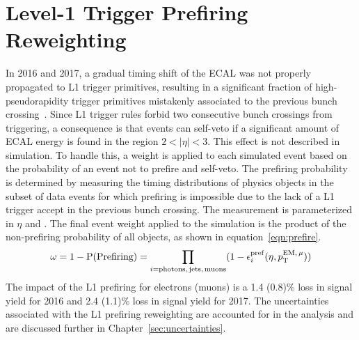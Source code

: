 \section{Level-1 Trigger Prefiring Reweighting}\label{sec:L1}
In 2016 and 2017, a gradual timing shift of the ECAL was not properly propagated to 
L1 trigger primitives, resulting in a significant fraction of high-pseudorapidity trigger primitives
mistakenly associated to the previous bunch crossing~\cite{L1_prefire}. 
Since L1 trigger rules forbid two consecutive bunch crossings from triggering, 
a consequence is that events can self-veto if a significant amount of ECAL energy is found in the region 
$2<|\eta|<3$. This effect is not described in simulation.
To handle this, a weight is applied to each simulated event based on the probability of an event not to prefire and self-veto. 
The prefiring probability is determined by measuring the timing distributions of physics objects in the subset of data events for which prefiring 
is impossible due to the lack of a L1 trigger accept in the previous bunch crossing. The measurement is parameterized in 
$\eta$ and \pt. The final event weight applied to the simulation is the product of the non-prefiring probability of all objects, as shown in equation~\ref{eqn:prefire}.
\begin{equation}
	\omega = 1 - \mathrm{P(Prefiring)} = \prod_{i=\mathrm{photons,\,jets,\,muons}}(1-\epsilon_i^{\mathrm{pref}}(\eta,p_{\mathrm{T}}^{\mathrm{EM,\,\mu}}))
	\label{eqn:prefire}
\end{equation}
The impact of the L1 prefiring for electrons (muons) is a 1.4 (0.8)\% loss in signal yield for 2016 and 2.4 (1.1)\% loss in signal yield for 2017.
The uncertainties associated with the L1 prefiring reweighting are accounted for in the analysis and are discussed further in Chapter~\ref{sec:uncertainties}.
